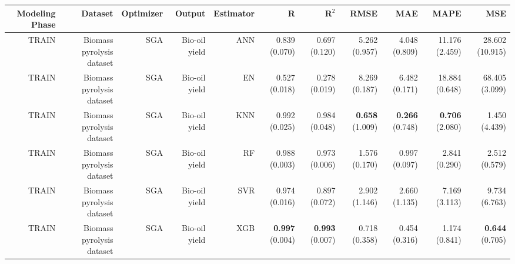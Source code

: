\begin{table}
\centering
\label{eml___comparison_datasets_table_sga_biomass_pyrolysis_dataset_train.tex}
\begin{tabular}{rrrrrrrrrrr}
\toprule
Modeling Phase &                   Dataset & Optimizer &        Output & Estimator &                    R &                R$^2$ &                 RMSE &                  MAE &                 MAPE &                  MSE \\
\midrule
         TRAIN & Biomass pyrolysis dataset &       SGA & Bio-oil yield &       ANN &        0.839 (0.070) &        0.697 (0.120) &        5.262 (0.957) &        4.048 (0.809) &       11.176 (2.459) &      28.602 (10.915) \\
         TRAIN & Biomass pyrolysis dataset &       SGA & Bio-oil yield &        EN &        0.527 (0.018) &        0.278 (0.019) &        8.269 (0.187) &        6.482 (0.171) &       18.884 (0.648) &       68.405 (3.099) \\
         TRAIN & Biomass pyrolysis dataset &       SGA & Bio-oil yield &       KNN &        0.992 (0.025) &        0.984 (0.048) & { \bf 0.658} (1.009) & { \bf 0.266} (0.748) & { \bf 0.706} (2.080) &        1.450 (4.439) \\
         TRAIN & Biomass pyrolysis dataset &       SGA & Bio-oil yield &        RF &        0.988 (0.003) &        0.973 (0.006) &        1.576 (0.170) &        0.997 (0.097) &        2.841 (0.290) &        2.512 (0.579) \\
         TRAIN & Biomass pyrolysis dataset &       SGA & Bio-oil yield &       SVR &        0.974 (0.016) &        0.897 (0.072) &        2.902 (1.146) &        2.660 (1.135) &        7.169 (3.113) &        9.734 (6.763) \\
         TRAIN & Biomass pyrolysis dataset &       SGA & Bio-oil yield &       XGB & { \bf 0.997} (0.004) & { \bf 0.993} (0.007) &        0.718 (0.358) &        0.454 (0.316) &        1.174 (0.841) & { \bf 0.644} (0.705) \\
\bottomrule
\end{tabular}
\end{table}
